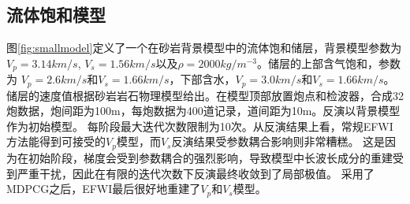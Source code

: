 \subsection{流体饱和模型}
图\ref{fig:smallmodel}定义了一个在砂岩背景模型中的流体饱和储层，背景模型参数为$V_p=3.14 km/s$, $V_s=1.56 km/s$以及$\rho=2000 kg/m^{-3}$。储层的上部含气饱和，参数为
$V_p=2.6 km/s$和$V_s=1.66 km/s$，下部含水，$V_p=3.0 km/s$和$V_s=1.66 km/s$。
储层的速度值根据砂岩岩石物理模型给出\cite[]{mavko2009rock}。在模型顶部放置炮点和检波器，合成32炮数据，炮间距为100m，每炮数据为400道记录，道间距为10m。反演以背景模型作为初始模型。
每阶段最大迭代次数限制为10次。从反演结果上看，常规EFWI方法能得到可接受的$V_p$模型，而$V_s$反演结果受参数耦合影响则非常糟糕。
这是因为在初始阶段，梯度会受到参数耦合的强烈影响，导致模型中长波长成分的重建受到严重干扰，因此在有限的迭代次数下反演最终收敛到了局部极值。
采用了MDPCG之后，EFWI最后很好地重建了$V_p$和$V_s$模型。
